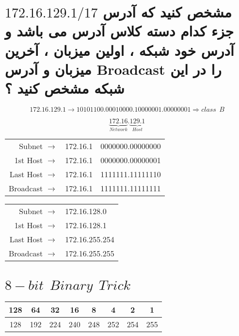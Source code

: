 \documentclass{article}
\begin{document}
\section{مشخص کنید که آدرس 
$
172.16.129.1/17
$
جزء کدام دسته کلاس آدرس می باشد و آدرس خود شبکه ، اولین میزبان ، آخرین میزبان و آدرس Broadcast را در این شبکه مشخص کنید ؟
}


$$
172.16.129.1 \to 10101100.00010000.10000001.00000001 \Rightarrow class \:\: B
$$


$$
\underbrace{172.16}_{Network}.\underbrace{129.1}_{Host}
$$



\begin{latin}
\begin{center}
  \begin{tabular}{ r  r | l  }
    Subnet $\to$ & 172.16.1 & 0000000.00000000 \\
    1st Host $\to$ & 172.16.1 & 0000000.00000001 \\
    Last Host $\to$ & 172.16.1 & 1111111.11111110 \\
    Broadcast $\to$ & 172.16.1 & 1111111.11111111 \\
  \end{tabular}
\end{center}
\end{latin}



\begin{latin}
\begin{center}
  \begin{tabular}{ r  l   }
    Subnet $\to$ & 172.16.128.0  \\
    1st Host $\to$ & 172.16.128.1  \\
    Last Host $\to$ & 172.16.255.254 \\
    Broadcast $\to$ & 172.16.255.255 \\
  \end{tabular}
\end{center}
\end{latin}


\section{$8-bit \:\: Binary \:\: Trick$}

\begin{latin}
\begin{center}
  \bgroup
  \def\arraystretch{1.5}%
  \begin{tabular}{ c c c c c c c c  }
    128 & 64 & 32 & 16 & 8 & 4 & 2 & 1 \\
    \hline
    128 & 192 & 224 & 240 & 248 & 252 & 254 & 255  \\
  \end{tabular}
  \egroup
\end{center}
\end{latin}
\end{document}

